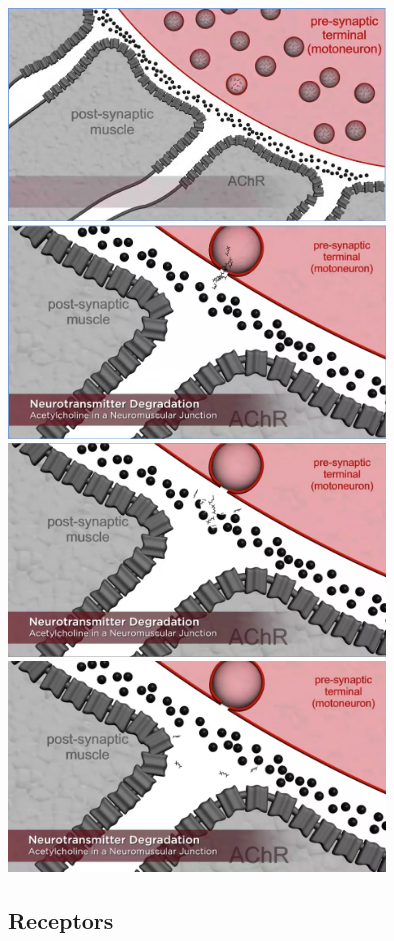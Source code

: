 \documentclass[12pt, a4paper]{article}
\begin{document}
{
    \centering
    \includegraphics[width=10cm]{enzyme_eat_nt1.png}
    \includegraphics[width=10cm]{enzyme_eat_nt2.png}
    \includegraphics[width=10cm]{enzyme_eat_nt3.png}
    \includegraphics[width=10cm]{enzyme_eat_nt4.png}

}

\subsection{Receptors}
\end{document}

